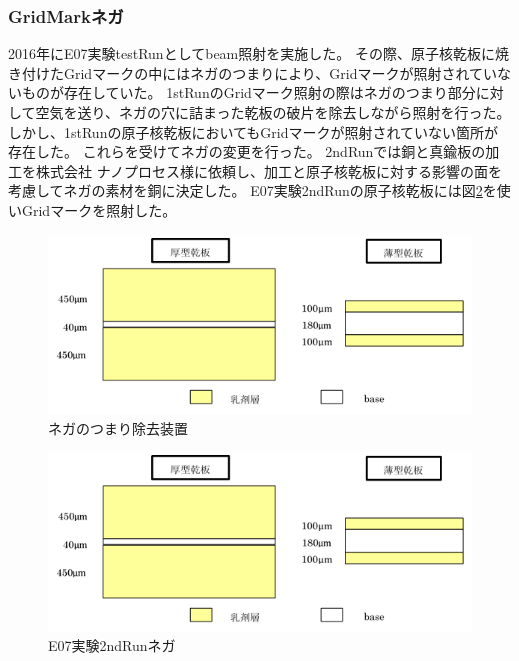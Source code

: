 \documentclass[12pt,a4paper]{jarticle}
\begin{document}
\subsubsection{GridMarkネガ}
2016年にE07実験testRunとしてbeam照射を実施した。
その際、原子核乾板に焼き付けたGridマークの中にはネガのつまりにより、Gridマークが照射されていないものが存在していた。
1stRunのGridマーク照射の際はネガのつまり部分に対して空気を送り、ネガの穴に詰まった乾板の破片を除去しながら照射を行った。
しかし、1stRunの原子核乾板においてもGridマークが照射されていない箇所が存在した。
これらを受けてネガの変更を行った。
2ndRunでは銅と真鍮板の加工を株式会社 ナノプロセス様に依頼し、加工と原子核乾板に対する影響の面を考慮してネガの素材を銅に決定した。
E07実験2ndRunの原子核乾板には図\ref{fig:nega_2ndRun}を使いGridマークを照射した。
\begin{figure}[htbp]
  \centering
    \includegraphics[width=140mm]{emulsionorder.png}
  \caption{ネガのつまり除去装置\label{fig:nega_cleaner}}
\end{figure}
\begin{figure}[htbp]
  \centering
    \includegraphics[width=140mm]{emulsionorder.png}
  \caption{E07実験2ndRunネガ\label{fig:nega_2ndRun}}
\end{figure}
\end{document}
